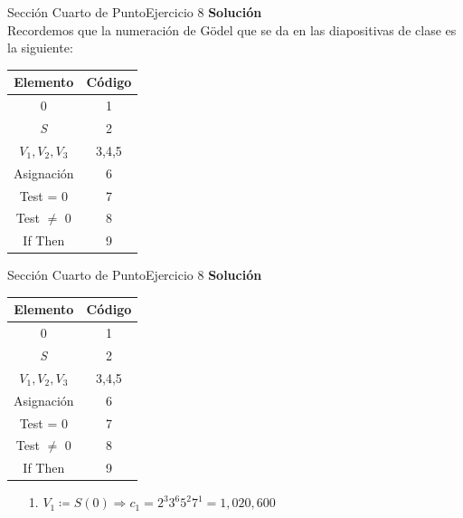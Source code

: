 \documentclass[10pt, envcountsect, presentation, aspectratio=169]{beamer}
\begin{document}

\begin{frame}{Sección Cuarto de Punto}{Ejercicio 8}
    \textbf{Solución}\\
    Recordemos que la numeración de Gödel que se da en las diapositivas de clase es la siguiente:
    \begin{table}[h]
        \centering
        \renewcommand{\arraystretch}{1.2}
        \begin{tabular}{|c|c|}
            \hline
            \textbf{Elemento} & \textbf{Código} \\
            \hline
            0 & 1 \\
            \hline
            \textit{S} & 2 \\
            \hline
            $V_1, V_2, V_3$ & 3,4,5 \\
            \hline
            Asignación & 6 \\
            \hline
            Test = 0 & 7 \\
            \hline
            Test $\neq$ 0 & 8 \\
            \hline
            If Then & 9 \\
            \hline
        \end{tabular}
    \end{table}
\end{frame}


\begin{frame}{Sección Cuarto de Punto}{Ejercicio 8}
    \textbf{Solución}\\
    \begin{table}[h]
        \centering
        \renewcommand{\arraystretch}{1.2}
        \begin{tabular}{|c|c|}
            \hline
            \textbf{Elemento} & \textbf{Código} \\
            \hline
            0 & 1 \\
            \hline
            \textit{S} & 2 \\
            \hline
            $V_1, V_2, V_3$ & 3,4,5 \\
            \hline
            Asignación & 6 \\
            \hline
            Test = 0 & 7 \\
            \hline
            Test $\neq$ 0 & 8 \\
            \hline
            If Then & 9 \\
            \hline
        \end{tabular}
    \end{table}
    \begin{itemize}
        \item[1.] $V_1 \coloneqq S(0) \Rightarrow c_1 = 2^3 3^6 5^2 7^1 = 1,020,600$
    \end{itemize}
\end{frame}
\end{document}
